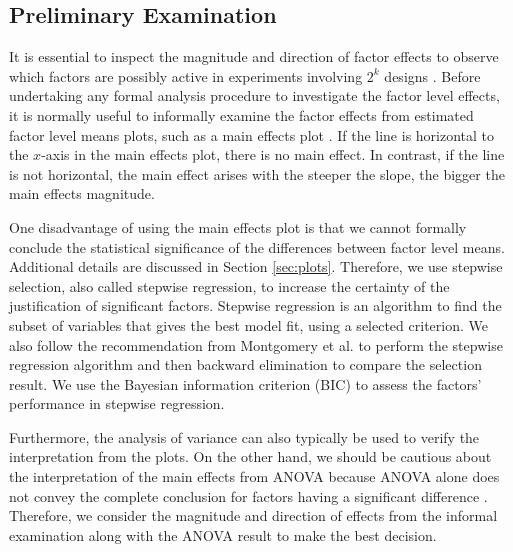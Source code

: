 \documentclass[11pt]{article}
\begin{document}
\subsection{Preliminary Examination}\label{sec:prelim}
It is essential to inspect the magnitude and direction of factor effects to observe which factors are possibly active in experiments involving $2^k$ designs \cite{bk:dae1}. Before undertaking any formal analysis procedure to investigate the factor level effects, it is normally useful to informally examine the factor effects from estimated factor level means plots, such as a main effects plot \cite{bk:dae1}. If the line is horizontal to the $x$-axis in the main effects plot, there is no main effect. In contrast, if the line is not horizontal, the main effect arises with the steeper the slope, the bigger the main effects magnitude.

One disadvantage of using the main effects plot is that we cannot formally conclude the statistical significance of the differences between factor level means. Additional details are discussed in Section \ref{sec:plots}. Therefore, we use stepwise selection, also called stepwise regression, to increase the certainty of the justification of significant factors. Stepwise regression is an algorithm to find the subset of variables that gives the best model fit, using a selected criterion. We also follow the recommendation from Montgomery et al. \cite{bk:ilra} to perform the stepwise regression algorithm and then backward elimination to compare the selection result. We use the Bayesian information criterion (BIC) to assess the factors' performance in stepwise regression.

Furthermore, the analysis of variance can also typically be used to verify the interpretation from the plots. On the other hand, we should be cautious about the interpretation of the main effects from ANOVA because ANOVA alone does not convey the complete conclusion for factors having a significant difference \cite{bk:dae1}. Therefore, we consider the magnitude and direction of effects from the informal examination along with the ANOVA result to make the best decision.
\end{document}

